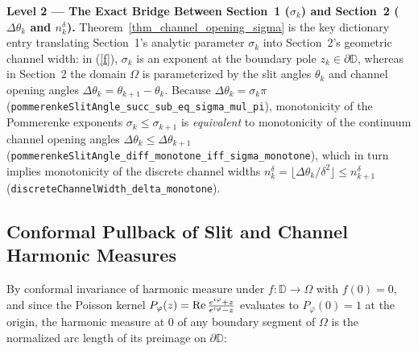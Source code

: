 \documentclass[11pt,reqno]{amsart}
\numberwithin{equation}{section}
\renewcommand{\phi}{\varphi}
\newcommand{\D}{\mathbb{D}}
\newcommand{\re}{\mbox{\rm Re\,}}
\begin{document}
\begin{leveltwo}
\noindent\textbf{\textcolor{l2border}{Level 2 --- The Exact Bridge Between Section~1 ($\sigma_k$) and Section~2 ($\Delta\theta_k$ and $n_k^{\delta}$).}}
Theorem~\ref{thm_channel_opening_sigma} is the key dictionary entry translating Section~1's analytic parameter $\sigma_k$ into Section~2's geometric channel width: in (\ref{f}), $\sigma_k$ is an exponent at the boundary pole $z_k \in \partial\D$, whereas in Section~2 the domain $\varOmega$ is parameterized by the slit angles $\theta_k$ and channel opening angles $\Delta\theta_k = \theta_{k+1} - \theta_k$. Because $\Delta\theta_k = \sigma_k\pi$ (\texttt{pommerenkeSlitAngle\_succ\_sub\_eq\_sigma\_mul\_pi}), monotonicity of the Pommerenke exponents $\sigma_k \le \sigma_{k+1}$ is \emph{equivalent} to monotonicity of the continuum channel opening angles $\Delta\theta_k \le \Delta\theta_{k+1}$ (\texttt{pommerenkeSlitAngle\_diff\_monotone\_iff\_sigma\_monotone}), which in turn implies monotonicity of the discrete channel widths $n_k^{\delta} = \lfloor \Delta\theta_k / \delta^2 \rfloor \le n_{k+1}^{\delta}$ (\texttt{discreteChannelWidth\_delta\_monotone}).
\end{leveltwo}

\subsection{Conformal Pullback of Slit and Channel Harmonic Measures}

By conformal invariance of harmonic measure under $f : \D \to \varOmega$ with $f(0) = 0$, and since the Poisson kernel $P_\phi(z) = \re\frac{e^{i\phi}+z}{e^{i\phi}-z}$ evaluates to $P_\phi(0) = 1$ at the origin, the harmonic measure at $0$ of any boundary segment of $\varOmega$ is the normalized arc length of its preimage on $\partial\D$:
\end{document}
